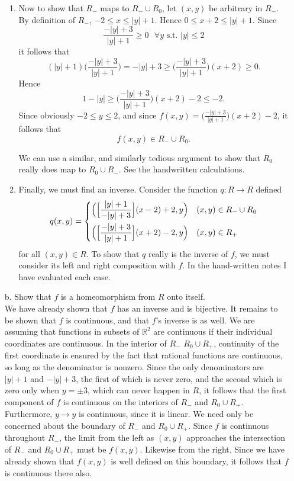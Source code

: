 \documentclass{article}
\newcommand{\R}{\mathbb{R}}
\newcommand{\R}{\mathbb{R}}
\begin{document}
\begin{itemize}
\begin{enumerate}
        \item Now to show that $R_-$ maps to $R_-\cup R_0$, let $(x,y)$ be arbitrary in $R_-$. By definition of $R_-$, $-2 \le x \le |y| + 1$. Hence $0 \le x + 2 \le |y| + 1 $. Since $$\frac{-|y|+ 3}{|y| + 1} \ge 0 \mbox{   } \forall y \mbox{ s.t. } |y| \le 2$$ it follows that 
        $$(|y| + 1)\Big(\frac{-|y|+3}{|y| + 1}\Big) = -|y| + 3 \ge \Big(\frac{-|y| + 3}{|y|+1}\Big)(x + 2) \ge 0.$$
        Hence 
        $$1-|y| \ge \Big(\frac{-|y| + 3}{|y|  +1}\Big)(x+2) - 2 \le -2.$$
        Since obviously $-2\le y \le 2$, and since $f(x,y) = \Big(\frac{-|y| + 3}{|y|  +1}\Big)(x+2) - 2$, it follows that 
        $$f(x,y)\in R_-\cup R_0.$$
        
        We can use a similar, and similarly tedious argument to show that $R_0$ really does map to $R_0\cup R_-$. See the handwritten calculations.
        \item Finally, we must find an inverse. Consider the function $q:R\rightarrow R$ defined 
        $$q(x,y) = \begin{dcases}
        \Big(\Big[\frac{|y| + 1}{-|y| + 3}\Big](x-2) + 2,y\Big) & (x,y)\in R_-\cup R_0\\
        \Big(\Big[\frac{-|y|+3}{|y| + 1}\Big](x + 2) - 2,y\Big) & (x,y)\in R_+
        \end{dcases}$$
        for all $(x,y)\in R$.
        To show that $q$ really is the inverse of $f$, we must consider its left and right composition with $f$. In the hand-written notes I have evaluated each case.
    
    \end{enumerate}
    \item[b. ] Show that $f$ is a homeomorphism from $R$ onto itself.\\
    
     We have already shown that $f$ has an inverse and is bijective. It remains to be shown that $f$ is continuous, and that $f$'s inverse is as well. We are assuming that functions in subsets of $\R^2$ are continuous if their individual coordinates are continuous. In the interior of $R_-$ $R_0\cup R_+$, continuity of the first coordinate is ensured by the fact that rational functions are continuous, so long as the denominator is nonzero. Since the only denominators are $|y| + 1$ and $-|y| + 3$, the first of which is never zero, and the second which is zero only when $y=\pm 3$, which can never happen in $R$, it follows that the first component of $f$ is continuous on the interiors of $R_-$ and $R_0\cup R_+$. Furthermore, $y \rightarrow y$ is continuous, since it is linear. We need only be concerned about the boundary of $R_-$ and $R_0\cup R_+$. Since $f$ is continuous throughout $R_-$, the limit from the left as $(x,y)$ approaches the intersection of $R_-$ and $R_0\cup R_+$ must be $f(x,y)$. Likewise from the right. Since we have already shown that $f(x,y)$ is well defined on this boundary, it follows that $f$ is continuous there also.
    

\end{itemize}
\end{document}
